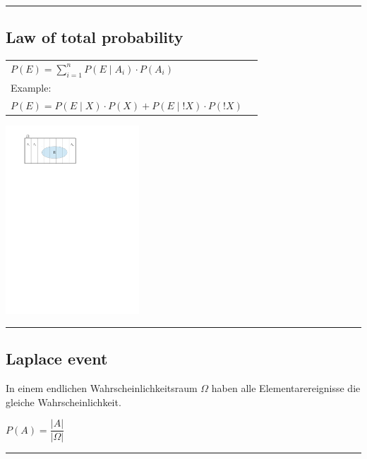 	\vspace{2mm}
	\hrule
	\vspace{3mm}

\subsection{Law of total probability }
  \begin{minipage}{10cm}
	  \begin{tabular}{ll}
			$P(E)=\sum\limits_{i=1}^n P(E\mid A_i)\cdot P(A_i)$ \\
			Example: \\
			$P(E)=P(E\mid X)\cdot P(X)+P(E\mid !X)\cdot P(!X)$
	  \end{tabular}
  \end{minipage} 
  \begin{minipage}{10cm}
  	\includegraphics[width=5cm]{./Content/EreignisseWahrscheinlichkeit/total_probability.pdf}
  \end{minipage}
	
	\vspace{2mm}
	\hrule
	\vspace{3mm}
				
\subsection{Laplace event}
		In einem endlichen Wahrscheinlichkeitsraum $\Omega$ haben alle
		Elementarereignisse die gleiche Wahrscheinlichkeit.
		\begin{center}
		$P(A)=\dfrac{\left| A\right|}{\left|\Omega\right|}$
		\end{center}
		
	\vspace{2mm}
	\hrule
	\vspace{3mm}

\vfill
\newpage
	
	

